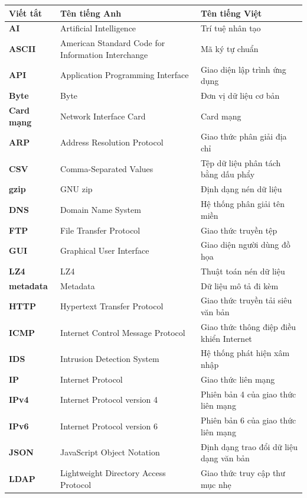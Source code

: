 \documentclass[../DoAn.tex]{subfiles}
\begin{document}
\begin{longtable}{l p{6cm} p{7cm}}
\hline
\textbf{Viết tắt} & \textbf{Tên tiếng Anh} & \textbf{Tên tiếng Việt} \\ \hline
\textbf{AI} & Artificial Intelligence & Trí tuệ nhân tạo \\ \hline
\textbf{ASCII} & American Standard Code for Information Interchange & Mã ký tự chuẩn \\ \hline
\textbf{API} & Application Programming Interface & Giao diện lập trình ứng dụng \\ \hline
\textbf{Byte} & Byte & Đơn vị dữ liệu cơ bản \\ \hline
\textbf{Card mạng} & Network Interface Card & Card mạng \\ \hline
\textbf{ARP} & Address Resolution Protocol & Giao thức phân giải địa chỉ \\ \hline
\textbf{CSV} & Comma-Separated Values & Tệp dữ liệu phân tách bằng dấu phẩy \\ \hline
\textbf{gzip} & GNU zip & Định dạng nén dữ liệu \\ \hline
\textbf{DNS} & Domain Name System & Hệ thống phân giải tên miền \\ \hline
\textbf{FTP} & File Transfer Protocol & Giao thức truyền tệp \\ \hline
\textbf{GUI} & Graphical User Interface & Giao diện người dùng đồ họa \\ \hline
\textbf{LZ4} & LZ4 & Thuật toán nén dữ liệu \\ \hline
\textbf{metadata} & Metadata & Dữ liệu mô tả đi kèm \\ \hline
\textbf{HTTP} & Hypertext Transfer Protocol & Giao thức truyền tải siêu văn bản \\ \hline
\textbf{ICMP} & Internet Control Message Protocol & Giao thức thông điệp điều khiển Internet \\ \hline
\textbf{IDS} & Intrusion Detection System & Hệ thống phát hiện xâm nhập \\ \hline
\textbf{IP} & Internet Protocol & Giao thức liên mạng \\ \hline
\textbf{IPv4} & Internet Protocol version 4 & Phiên bản 4 của giao thức liên mạng \\ \hline
\textbf{IPv6} & Internet Protocol version 6 & Phiên bản 6 của giao thức liên mạng \\ \hline
\textbf{JSON} & JavaScript Object Notation & Định dạng trao đổi dữ liệu dạng văn bản \\ \hline
\textbf{LDAP} & Lightweight Directory Access Protocol & Giao thức truy cập thư mục nhẹ \\ \hline

\end{longtable}
\end{document}
